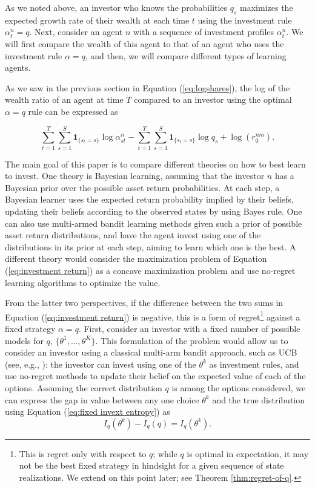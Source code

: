 As we noted above, an investor who knows the probabilities $q_s$   maximizes the expected growth rate of their wealth at each time $t$ using the investment rule $\alpha^n_{t}=q$. 
Next, consider an agent $n$  with a sequence of investment profiles $\alpha_t^n$. We will first compare the wealth of this agent to that of an agent who uses the investment rule $\alpha=q$, and then, we will compare different types of learning agents.

As we saw in the previous section in Equation (\ref{eq:logshares}), the log of the wealth ratio of an agent at time $T$ compared to an investor using the optimal $\alpha = q$ rule can be expressed as

\begin{equation}
\label{eq:investment return}
\sum_{t=1}^{T}\sum_{s=1} ^S \mathbf{1}_{\{s_t = s\}} \log \alpha^n_{st} -\sum_{t=1}^{T}\sum_{s=1} ^S \mathbf{1}_{\{s_t = s\}} \log q_s
+ \log(r^{nm}_{0}). 
\end{equation}

The main goal of this paper is to compare different theories on how to best learn to invest. One theory is Bayesian learning, assuming that the investor $n$ has a Bayesian prior over the possible asset return probabilities. At each step, a Bayesian learner uses the expected return probability implied by their beliefs, updating their beliefs according to the observed states by using Bayes rule. One can also use multi-armed bandit learning methods given such a prior of possible asset return distributions, and have the agent invest using one of the distributions in its prior at each step, aiming to learn which one is the best. A different theory would consider the maximization problem of Equation (\ref{eq:investment return}) as a concave maximization problem and use no-regret learning algorithms to optimize the value. 

From the latter two perspectives, if the difference between the two sums in Equation (\ref{eq:investment return}) is negative, this is a form of regret\footnote{\label{footnote:regret-wrt-q}This is regret only with respect to $q$; while $q$ is optimal in expectation, it may not be the best fixed strategy in hindsight for a given sequence of state realizations. We extend on this point later; see Theorem  \ref{thm:regret-of-q}.} 
against a fixed strategy $\alpha=q$. First, consider an investor with a fixed number of possible models for $q$, $\{\theta^1, \ldots, \theta^K\}$. 
This formulation of the problem would allow us to consider an investor using a classical multi-arm bandit approach, such as UCB (see, e.g., \cite{slivkins2019introduction}): the investor can invest using one of the $\theta^k$ as investment rules, and use no-regret methods to update their belief on the expected value of each of the options. Assuming the correct distribution $q$ is among the options considered, we can express the gap in value between any one choice $\theta^k$ and the true distribution using Equation (\ref{eq:fixed invext entropy}) as 
\begin{equation}\label{eq:MAP-gap}
   I_q(\theta^k)-I_q(q)=I_q(\theta^k).
\end{equation}

